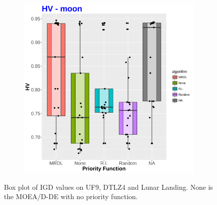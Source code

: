 \begin{figure}[!t]
\begin{subfigure}[b]{0.33\textwidth}
	\includegraphics[width=1\textwidth, height=0.77\textwidth]{images/moon_HV}
\end{subfigure}
	\caption{Box plot of IGD values on UF9, DTLZ4 and Lunar Landing. None is the MOEA/D-DE with no priority function.}
		\label{IGDS}
\end{figure}


%
%


